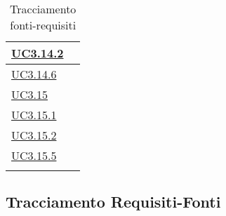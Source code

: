 \begin{longtable}{|P{6cm}|P{6cm}|}
	\hline \hyperref[UC3.14.2]{UC3.14.2} &  \\
	\hline \hyperref[UC3.14.6]{UC3.14.6} &  \\
	\hline \hyperref[UC3.15]{UC3.15} &  \\
	\hline \hyperref[UC3.15.1]{UC3.15.1} &  \\
	\hline \hyperref[UC3.15.2]{UC3.15.2} &  \\
	\hline \hyperref[UC3.15.5]{UC3.15.5} &  \\
	\hline
	\caption{Tracciamento fonti-requisiti}
\end{longtable}

\subsection{Tracciamento Requisiti-Fonti}

